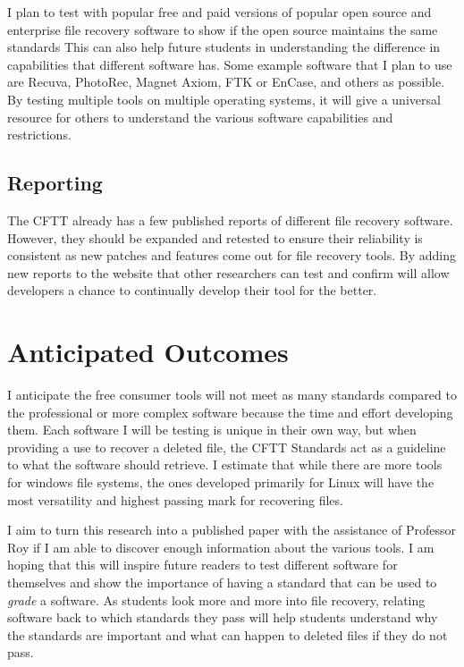 I plan to test with popular free and paid versions of popular open source and enterprise file recovery software to 
show if the open source maintains the same standards This can also help future students in understanding the difference in 
capabilities that different software has. Some example software that I plan to use are 
Recuva, PhotoRec, Magnet Axiom, FTK or EnCase,  
and others as possible. By testing multiple tools on multiple operating systems, it will give a universal resource for 
others to understand the various software capabilities and restrictions. 

\subsection{Reporting}
The CFTT already has a few published reports of different file recovery software. However, they should be expanded and 
retested to ensure their reliability is consistent as new patches and features come out for file recovery tools. By 
adding new reports to the website that other researchers can test and confirm will allow developers a chance to continually 
develop their tool for the better.

\section{Anticipated Outcomes}
I anticipate the free consumer tools will not meet as many standards compared to the professional or more complex software 
because the time and effort developing them. Each software I will be testing is unique in their own way, 
but when providing a use to recover a deleted file, the CFTT Standards act as a guideline to what 
the software should retrieve. I estimate that while there are more tools for windows file systems, the ones 
developed primarily for Linux will have the most versatility and highest passing mark for recovering files. 

I aim to turn this research into a published paper with the assistance of Professor Roy if I am able 
to discover enough information about the various tools. I am hoping that this will inspire future readers to test 
different software for themselves and show the importance of having a standard that can be used to \emph{grade} a software.
As students look more and more into file recovery, relating software back to which standards they pass will help students 
understand why the standards are important and what can happen to deleted files if they do not pass. 

